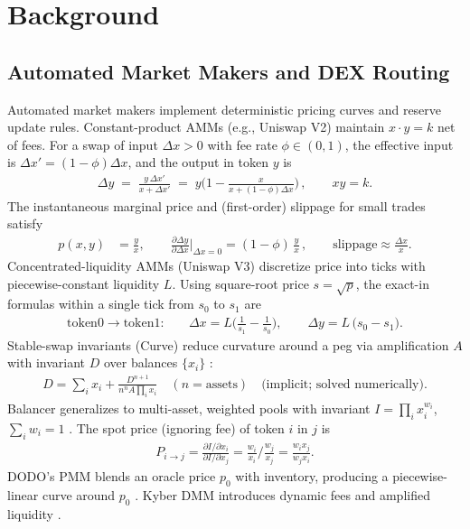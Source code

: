 \documentclass[11pt]{article}
\newcommand{\1}{\mathbf{1}}  %
\begin{document}
\section{Background}
\label{sec:background}
\subsection{Automated Market Makers and DEX Routing}
Automated market makers implement deterministic pricing curves and reserve update rules. Constant-product AMMs (e.g., Uniswap V2) maintain $x\cdot y = k$ net of fees. For a swap of input $\Delta x>0$ with fee rate $\phi\in(0,1)$, the effective input is $\Delta x'=(1-\phi)\Delta x$, and the output in token $y$ is
\begin{align}
\Delta y \;=\; \frac{y\,\Delta x'}{x + \Delta x'} \;=\; y\Big(1 - \frac{x}{x+(1-\phi)\Delta x}\Big)\, ,\qquad x y = k.
\end{align}
The instantaneous marginal price and (first-order) slippage for small trades satisfy
\begin{align}
 p(x,y) &= \frac{y}{x},\qquad \frac{\partial \Delta y}{\partial \Delta x}\Big\rvert_{\Delta x=0} = (1-\phi)\,\frac{y}{x} \, ,\qquad \text{slippage} \approx \frac{\Delta x}{x}.
\end{align}
Concentrated-liquidity AMMs (Uniswap V3) discretize price into ticks with piecewise-constant liquidity $L$. Using square-root price $s=\sqrt{p}$, the exact-in formulas within a single tick from $s_0$ to $s_1$ are \cite{uniswapv3}
\begin{align}
\text{token0}\to\text{token1}:\quad &\Delta x = L\Big(\tfrac{1}{s_1}-\tfrac{1}{s_0}\Big),\qquad \Delta y = L\,\big(s_0 - s_1\big).\label{eq:v3}
\end{align}
Stable-swap invariants (Curve) reduce curvature around a peg via amplification $A$ with invariant $D$ over balances $\{x_i\}$ \cite{curvewp}:
\begin{align}
D = \sum_i x_i + \frac{D^{n+1}}{n^n A \prod_i x_i}\quad (n=\text{assets})\quad \text{(implicit; solved numerically)}.
\end{align}
Balancer generalizes to multi-asset, weighted pools with invariant $I=\prod_{i} x_i^{w_i}$, $\sum_i w_i=1$ \cite{balancerwp}. The spot price (ignoring fee) of token $i$ in $j$ is
\begin{align}
P_{i\to j} = \frac{\partial I/\partial x_i}{\partial I/\partial x_j} = \frac{w_i}{x_i}\Big/\frac{w_j}{x_j} = \frac{w_i x_j}{w_j x_i}.
\end{align}
DODO's PMM blends an oracle price $p_0$ with inventory, producing a piecewise-linear curve around $p_0$ \cite{dodo}. Kyber DMM introduces dynamic fees and amplified liquidity \cite{kyberdmm}.
\end{document}
